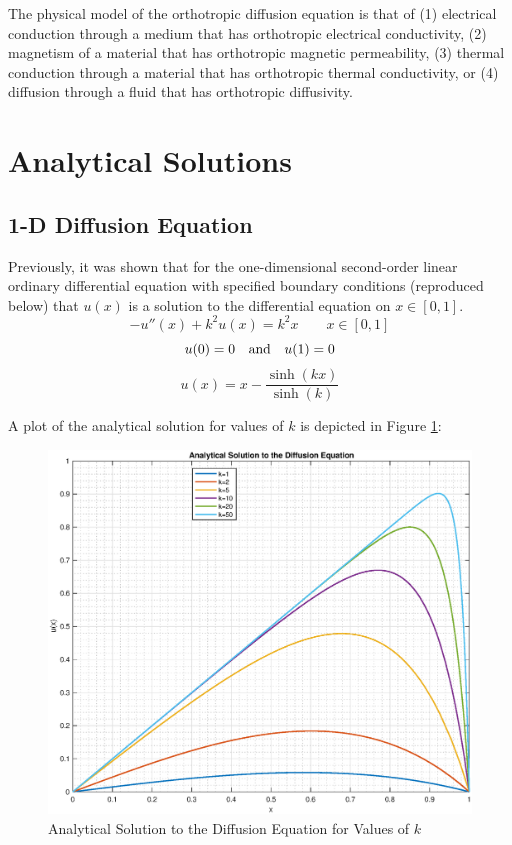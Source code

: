 \documentclass[10pt]{article}		%
\numberwithin{equation}{section}
\begin{document}
The physical model of the orthotropic diffusion equation is that of (1) electrical conduction through a medium that has orthotropic electrical conductivity, (2) magnetism of a material that has orthotropic magnetic permeability, (3) thermal conduction through a material that has orthotropic thermal conductivity, or (4) diffusion through a fluid that has orthotropic diffusivity.

\newpage

\section{Analytical Solutions}

\subsection{1-D Diffusion Equation}

Previously, it was shown that for the one-dimensional second-order linear ordinary differential equation with specified boundary conditions (reproduced below) that $u(x)$ is a solution to the differential equation on $x \in [0, 1]$.
\begin{equation}
-u''(x)+k^2u(x)=k^2x \qquad x \in [0, 1]
\end{equation}
\begin{equation}
u(0) = 0 \quad \textnormal{and} \quad u(1) = 0 
\end{equation}
\begin{equation}
u(x) = x - \frac{\sinh(kx)}{\sinh(k)}
\end{equation}

A plot of the analytical solution for values of $k$ is depicted in Figure \ref{fig:analytical_diff}:
\begin{figure}[H]
	\begin{center}
		\includegraphics[width = 0.95\linewidth]{analytical_solution_diffusion}
		\caption{Analytical Solution to the Diffusion Equation for Values of $k$}
		\label{fig:analytical_diff}
	\end{center}
\end{figure}
\end{document}

